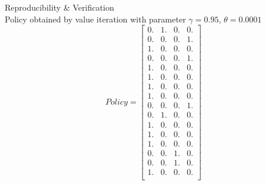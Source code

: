 \documentclass[12pt]{article}
\newenvironment{problem}[2][\large Problem]{\begin{trivlist}
\item[\hskip \labelsep {\bfseries #1}\hskip \labelsep {\bfseries #2.}]}{\end{trivlist}}
\begin{document}
\begin{problem} {4} Reproducibility \& Verification\\

Policy obtained by value iteration with parameter $\gamma = 0.95 $, $\theta = 0.0001$
$$ Policy = \begin{bmatrix} 
 0. & 1. & 0. & 0.\\
 0. & 0. & 0. & 1.\\
 1. & 0. & 0. & 0.\\
 0. & 0. & 0. & 1.\\
 1. & 0. & 0. & 0.\\
 1. & 0. & 0. & 0.\\
 1. & 0. & 0. & 0.\\
 1. & 0. & 0. & 0.\\
 0. & 0. & 0. & 1.\\
 0. & 1. & 0. & 0.\\
 1. & 0. & 0. & 0.\\
 1. & 0. & 0. & 0.\\
 1. & 0. & 0. & 0.\\
 0. & 0. & 1. & 0.\\
 0. & 0. & 1. & 0.\\
 1. & 0. & 0. & 0.\\
\end{bmatrix} $$ 

\end{problem}
\end{document}
